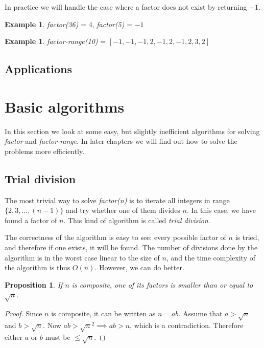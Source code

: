 \documentclass[12pt] {article}
\theoremstyle{plain}
\newtheorem{prop}[thm]{Proposition}
\theoremstyle{definition}
\newtheorem{exmp}[thm]{Example}
\begin{document}
In practice we will handle the case where a factor does not exist by returning $-1$.

\begin{exmp}
\textit{factor(36)} = $4$, \textit{factor(5)} = $-1$
\end{exmp}

\begin{exmp}
\textit{factor-range(10)} = $[-1, -1, -1, 2, -1, 2, -1, 2, 3, 2]$
\end{exmp}

\subsection {Applications}

\section {Basic algorithms}

In this section we look at some easy, but slightly inefficient algorithms for solving \textit{factor} and \textit{factor-range}. In later chapters we will find out how to solve the problems more efficiently.

\subsection {Trial division}

The most trivial way to solve \textit{factor(n)} is to iterate all integers in range $\{2, 3, \dots, (n-1)\}$ and try whether one of them divides $n$. In this case, we have found a factor of $n$. This kind of algorithm is called \textit{trial division}. 

The correctness of the algorithm is easy to see: every possible factor of $n$ is tried, and therefore if one exists, it will be found. The number of divisions done by the algorithm is in the worst case linear to the size of $n$, and the time complexity of the algorithm is thus $O(n)$. However, we can do better.

\begin{prop}
\label {prop:factupperbound}
If $n$ is composite, one of its factors is smaller than or equal to $\sqrt{n}$.
\end{prop}

\begin{proof}
Since $n$ is composite, it can be written as $n = ab$. Assume that $a > \sqrt{n}$ and $b > \sqrt{n}$. Now $ab > \sqrt{n}^2 \implies ab > n$, which is a contradiction. Therefore either $a$ or $b$ must be $\leq \sqrt{n}$.
\end{proof}
\end{document}
